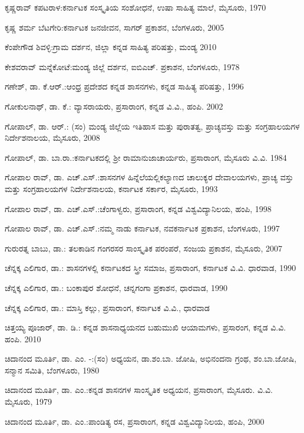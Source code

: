 \noindent
ಕೃಷ್ಣರಾವ್​ ಕಪಟರಾಳ:ಕರ್ನಾಟಕ ಸಂಸ್ಕೃತಿಯ ಸಂಶೋಧನೆ, ಉಷಾ ಸಾಹಿತ್ಯ ಮಾಲೆ, ಮೈಸೂರು, 1970

\noindent
ಕೃಷ್ಣ ಶರ್ಮ ಬೆಟಗೇರಿ:ಕರ್ನಾಟಕ ಜನಜೀವನ, ಸಾಗರ್​ ಪ್ರಕಾಶನ, ಬೆಂಗಳೂರು, 2005

\noindent
ಕೆಂಪೇಗೌಡ ಶಿವಳ್ಳಿ:ಗ್ರಾಮ ದರ್ಶನ, ಜಿಲ್ಲಾ ಕನ್ನಡ ಸಾಹಿತ್ಯ ಪರಿಷತ್ತು, ಮಂಡ್ಯ 2010

\noindent
ಕೇಶವರಾವ್​ ಮನ್ನೆಕೋಟೆ:ಮಂಡ್ಯ ಜಿಲ್ಲೆ ದರ್ಶನ, ಐಬಿಎಚ್​. ಪ್ರಕಾಶನ, ಬೆಂಗಳೂರು, 1978

\noindent
ಗಣೇಶ್​, ಡಾ. ಕೆ.ಆರ್​.:ಆಂಧ್ರ ಪ್ರದೇಶದ ಕನ್ನಡ ಶಾಸನಗಳು, ಕನ್ನಡ ಸಾಹಿತ್ಯ ಪರಿಷತ್ತು, 1996

\noindent
ಗೋಕುಲನಾಥ್​, ಡಾ. ಕೆ.: ವ್ಯಾಸರಾಯರು, ಪ್ರಸಾರಾಂಗ, ಕನ್ನಡ ವಿ.ವಿ., ಹಂಪಿ. 2002

\noindent
ಗೋಪಾಲ್​, ಡಾ. ಆರ್​.: (ಸಂ) ಮಂಡ್ಯ ಜಿಲ್ಲೆಯ ಇತಿಹಾಸ ಮತ್ತು ಪುರಾತತ್ವ, ಪ್ರಾಚ್ಯವಸ್ತು ಮತ್ತು ಸಂಗ್ರಹಾಲಯಗಳ ನಿರ್ದೇಶನಾಲಯ, ಮೈಸೂರು, 2008

\noindent
ಗೋಪಾಲ್​, ಡಾ. ಬಾ.ರಾ.:ಕರ್ನಾಟಕದಲ್ಲಿ ಶ‍್ರೀ ರಾಮಾನುಜಾಚಾರ್ಯರು, ಪ್ರಸಾರಾಂಗ, ಮೈಸೂರು ವಿ.ವಿ. 1984

\noindent
ಗೋಪಾಲ ರಾವ್​, ಡಾ. ಎಚ್​.ಎಸ್​.:ಶಾಸನಗಳ ಹಿನ್ನೆಲೆಯಲ್ಲಿಕಲ್ಯಾಣದ ಚಾಲುಕ್ಯರ ದೇವಾಲಯಗಳು, ಪ್ರಾಚ್ಯ ವಸ್ತು ಮತ್ತು ಸಂಗ್ರಹಾಲಯಗಳ ನಿರ್ದೇಶನಾಲಯ, ಕರ್ನಾಟಕ ಸರ್ಕಾರ, ಮೈಸೂರು, 1993

\noindent
ಗೋಪಾಲ ರಾವ್​, ಡಾ. ಎಚ್​.ಎಸ್​.:ಚೆಂಗಾಳ್ವರು, ಪ್ರಸಾರಾಂಗ, ಕನ್ನಡ ವಿಶ್ವವಿದ್ಯಾನಿಲಯ, ಹಂಪಿ, 1998

\noindent
ಗೋಪಾಲ ರಾವ್​, ಡಾ. ಎಚ್​.ಎಸ್​.:ನಮ್ಮ ನಾಡು ಕರ್ನಾಟಕ, ನವಕರ್ನಾಟಕ ಪ್ರಕಾಶನ, ಬೆಂಗಳೂರು, 1997

\noindent
ಗುರುರತ್ನ ಬಾಬು, ಡಾ.: ತಲಕಾಡಿನ ಗಂಗರಸರ ಸಾಂಸ್ಕೃತಿಕ ಪರಂಪರೆ, ಸಂಜಯ ಪ್ರಕಾಶನ, ಮೈಸೂರು, 2007

\noindent
ಚೆನ್ನಕ್ಕ ಎಲಿಗಾರ, ಡಾ.: ಶಾಸನಗಳಲ್ಲಿ ಕರ್ನಾಟಕದ ಸ್ತ್ರೀ ಸಮಾಜ, ಪ್ರಸಾರಾಂಗ, ಕರ್ನಾಟಕ ವಿ.ವಿ. ಧಾರವಾಡ, 1990

\noindent
ಚೆನ್ನಕ್ಕ ಎಲಿಗಾರ, ಡಾ.: ಬಂಕಾಪುರ ಶೋಧನೆ, ಚನ್ನಗಂಗಾ ಪ್ರಕಾಶನ, ಧಾರವಾಡ, 1990

\noindent
ಚೆನ್ನಕ್ಕ ಎಲಿಗಾರ, ಡಾ.: ಮಾಸ್ತಿ ಕಲ್ಲು, ಪ್ರಸಾರಾಂಗ, ಕರ್ನಾಟಕ ವಿ.ವಿ., ಧಾರವಾಡ

\noindent
ಚಿತ್ತಯ್ಯ ಪೂಜಾರ್​, ಡಾ. ಡಿ.: ಕನ್ನಡ ಶಾಸನಾಧ್ಯಯನದ ಬಹುಮುಖಿ ಆಯಾಮಗಳು, ಪ್ರಸಾರಂಗ, ಕನ್ನಡ ವಿ.ವಿ. ಹಂಪಿ. 2010

\noindent
ಚಿದಾನಂದ ಮೂರ್ತಿ, ಡಾ. ಎಂ. -:(ಸಂ) ಅಧ್ಯಯನ, ಡಾ.ಶಂ.ಬಾ. ಜೋಷಿ, ಅಭಿನಂದನಾ ಗ್ರಂಥ, ಶಂ.ಬಾ.ಜೋಷಿ, ಸನ್ಮಾನ ಸಮಿತಿ, ಬೆಂಗಳೂರು, 1980

\noindent
ಚಿದಾನಂದ ಮೂರ್ತಿ, ಡಾ. ಎಂ.:ಕನ್ನಡ ಶಾಸನಗಳ ಸಾಂಸ್ಕೃತಿಕ ಅಧ್ಯಯನ, ಪ್ರಸಾರಾಂಗ, ಮೈಸೂರು. ವಿ.ವಿ. ಮೈಸೂರು, 1979

\noindent
ಚಿದಾನಂದ ಮೂರ್ತಿ, ಡಾ. ಎಂ.:ಪಾಂಡಿತ್ಯ ರಸ, ಪ್ರಸಾರಾಂಗ, ಕನ್ನಡ ವಿಶ್ವವಿದ್ಯಾನಿಲಯ, ಹಂಪಿ, 2000

